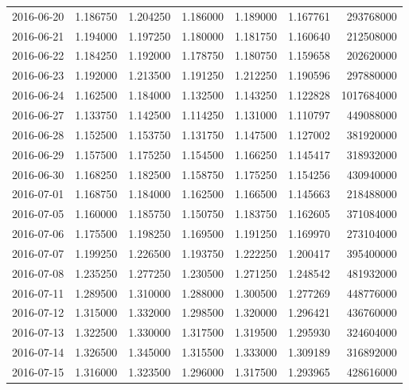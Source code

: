 \begin{tabular}{lrrrrrr}
2016-06-20 &    1.186750 &    1.204250 &    1.186000 &    1.189000 &    1.167761 &   293768000 \\
2016-06-21 &    1.194000 &    1.197250 &    1.180000 &    1.181750 &    1.160640 &   212508000 \\
2016-06-22 &    1.184250 &    1.192000 &    1.178750 &    1.180750 &    1.159658 &   202620000 \\
2016-06-23 &    1.192000 &    1.213500 &    1.191250 &    1.212250 &    1.190596 &   297880000 \\
2016-06-24 &    1.162500 &    1.184000 &    1.132500 &    1.143250 &    1.122828 &  1017684000 \\
2016-06-27 &    1.133750 &    1.142500 &    1.114250 &    1.131000 &    1.110797 &   449088000 \\
2016-06-28 &    1.152500 &    1.153750 &    1.131750 &    1.147500 &    1.127002 &   381920000 \\
2016-06-29 &    1.157500 &    1.175250 &    1.154500 &    1.166250 &    1.145417 &   318932000 \\
2016-06-30 &    1.168250 &    1.182500 &    1.158750 &    1.175250 &    1.154256 &   430940000 \\
2016-07-01 &    1.168750 &    1.184000 &    1.162500 &    1.166500 &    1.145663 &   218488000 \\
2016-07-05 &    1.160000 &    1.185750 &    1.150750 &    1.183750 &    1.162605 &   371084000 \\
2016-07-06 &    1.175500 &    1.198250 &    1.169500 &    1.191250 &    1.169970 &   273104000 \\
2016-07-07 &    1.199250 &    1.226500 &    1.193750 &    1.222250 &    1.200417 &   395400000 \\
2016-07-08 &    1.235250 &    1.277250 &    1.230500 &    1.271250 &    1.248542 &   481932000 \\
2016-07-11 &    1.289500 &    1.310000 &    1.288000 &    1.300500 &    1.277269 &   448776000 \\
2016-07-12 &    1.315000 &    1.332000 &    1.298500 &    1.320000 &    1.296421 &   436760000 \\
2016-07-13 &    1.322500 &    1.330000 &    1.317500 &    1.319500 &    1.295930 &   324604000 \\
2016-07-14 &    1.326500 &    1.345000 &    1.315500 &    1.333000 &    1.309189 &   316892000 \\
2016-07-15 &    1.316000 &    1.323500 &    1.296000 &    1.317500 &    1.293965 &   428616000 \\

\end{tabular}
